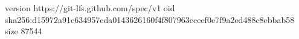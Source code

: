 version https://git-lfs.github.com/spec/v1
oid sha256:d15972a91c634957eda0143626160f4f807963eceef0e7f9a2ed488c8ebbab58
size 87544
